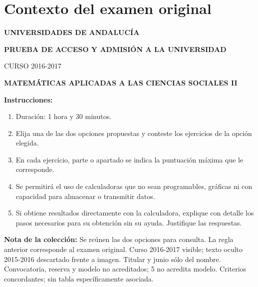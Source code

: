 \section*{Contexto del examen original}
\textbf{UNIVERSIDADES DE ANDALUCÍA}\par
\textbf{PRUEBA DE ACCESO Y ADMISIÓN A LA UNIVERSIDAD}\par
CURSO 2016-2017\par
\textbf{MATEMÁTICAS APLICADAS A LAS CIENCIAS SOCIALES II}

\textbf{Instrucciones:}
\begin{enumerate}[label=\textbf{\alph*)}]
  \item Duración: 1 hora y 30 minutos.
  \item Elija una de las dos opciones propuestas y conteste los ejercicios de la opción elegida.
  \item En cada ejercicio, parte o apartado se indica la puntuación máxima que le corresponde.
  \item Se permitirá el uso de calculadoras que no sean programables, gráficas ni con capacidad para almacenar o transmitir datos.
  \item Si obtiene resultados directamente con la calculadora, explique con detalle los pasos necesarios para su obtención sin su ayuda. Justifique las respuestas.
\end{enumerate}
\noindent\textbf{Nota de la colección:} Se reúnen las dos opciones para consulta. La regla anterior corresponde al examen original. Curso 2016-2017 visible; texto oculto 2015-2016 descartado frente a imagen. Titular y junio sólo del nombre. Convocatoria, reserva y modelo no acreditados; 5 no acredita modelo. Criterios concordantes; sin tabla específicamente asociada.
\par\medskip
